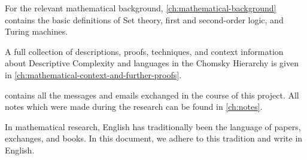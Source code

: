 For the relevant mathematical background, \cref{ch:mathematical-background} contains the basic definitions of Set theory, first and second-order logic, and Turing machines.

A full collection of descriptions, proofs, techniques, and context information about Descriptive Complexity and languages in the Chomsky Hierarchy is given in \cref{ch:mathematical-context-and-further-proofs}.

 contains all the messages and emails exchanged in the course of this project.
All notes which were made during the research can be found in \cref{ch:notes}.

In mathematical research, English has traditionally been the language of papers, exchanges, and books.
In this document, we adhere to this tradition and write in English.



